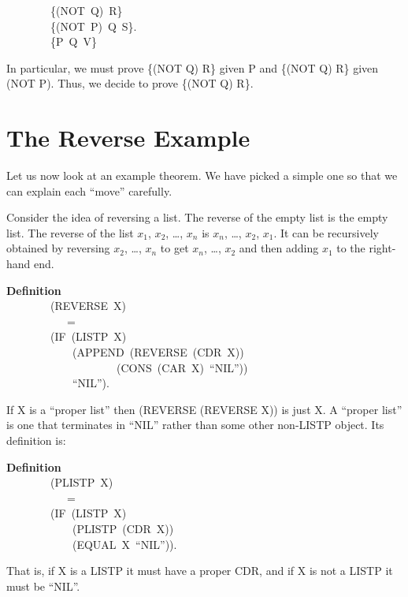 \documentclass[10pt]{book}
\newenvironment{pubasis}{\begin{flushleft}}{\end{flushleft}}
\newcommand{\axiomordefinition}[1]{\vspace{6pt}\Large\textsf{\textbf{#1}}\normalsize}
\begin{document}
\begin{pubasis}
~~~~~~~~\{(NOT~Q)~R\}\\

~~~~~~~~\{(NOT~P)~Q~S\}.\\

~~~~~~~~\{P~Q~V\}\\
\end{pubasis}
In particular, 
we must prove \{(NOT Q) R\}
given P and \{(NOT Q) R\} given (NOT P).  Thus, we decide to prove 
\{(NOT Q) R\}.

\section{The Reverse Example}
Let us now look at an example theorem.  We have picked a
simple one so that we can explain each ``move'' carefully.

Consider the idea of reversing a list.  The reverse of the empty list
is the empty list.  The reverse of the list $x_{1}$, $x_{2}$, \ldots{}, $x_{n}$ is 
$x_{n}$, \ldots{}, $x_{2}$, $x_{1}$.  It can be recursively obtained
by reversing $x_{2}$, \ldots{}, $x_{n}$ to get $x_{n}$, \ldots{}, $x_{2}$ and then
adding $x_{1}$ to the right-hand end.
\begin{pubasis}
\axiomordefinition{Definition}\\
~~~~~~~~(REVERSE~X)\\
~~~~~~~~~~~=\\
~~~~~~~~(IF~(LISTP~X)\\
~~~~~~~~~~~~(APPEND~(REVERSE~(CDR~X))\\
~~~~~~~~~~~~~~~~~~~~(CONS~(CAR~X)~``NIL''))\\
~~~~~~~~~~~~``NIL'').\\
\end{pubasis}
If X is a ``proper list'' then (REVERSE (REVERSE X))
is just X.  A ``proper list'' is one that terminates in ``NIL'' rather
than some other non-LISTP object.  Its definition is:
\begin{pubasis}
\axiomordefinition{Definition}\\
~~~~~~~~(PLISTP~X)\\
~~~~~~~~~~~=\\
~~~~~~~~(IF~(LISTP~X)\\
~~~~~~~~~~~~(PLISTP~(CDR~X))\\
~~~~~~~~~~~~(EQUAL~X~``NIL'')).\\
\end{pubasis}
That is, if X is a LISTP it must have a proper CDR, and if X is not a LISTP
it must be ``NIL''.
\end{document}
